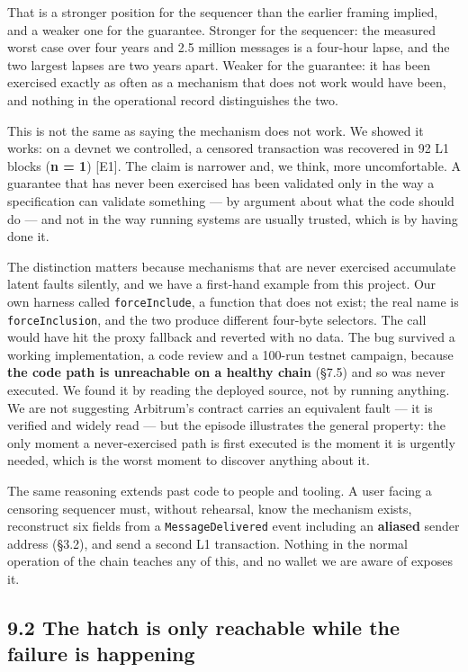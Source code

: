 \documentclass[conference]{IEEEtran}
\renewcommand{\_}{\textunderscore\allowbreak}
\begin{document}
That is a stronger position for the sequencer than the earlier framing
implied, and a weaker one for the guarantee. Stronger for the sequencer:
the measured worst case over four years and 2.5 million messages is a
four-hour lapse, and the two largest lapses are two years apart. Weaker
for the guarantee: it has been exercised exactly as often as a mechanism
that does not work would have been, and nothing in the operational
record distinguishes the two.

This is not the same as saying the mechanism does not work. We showed it
works: on a devnet we controlled, a censored transaction was recovered
in 92 L1 blocks (\textbf{n = 1}) {[}E1{]}. The claim is narrower and, we
think, more uncomfortable. A guarantee that has never been exercised has
been validated only in the way a specification can validate something
--- by argument about what the code should do --- and not in the way
running systems are usually trusted, which is by having done it.

The distinction matters because mechanisms that are never exercised
accumulate latent faults silently, and we have a first-hand example from
this project. Our own harness called \texttt{forceInclude}, a function
that does not exist; the real name is \texttt{forceInclusion}, and the
two produce different four-byte selectors. The call would have hit the
proxy fallback and reverted with no data. The bug survived a working
implementation, a code review and a 100-run testnet campaign, because
\textbf{the code path is unreachable on a healthy chain} (§7.5) and so
was never executed. We found it by reading the deployed source, not by
running anything. We are not suggesting Arbitrum's contract carries an
equivalent fault --- it is verified and widely read --- but the episode
illustrates the general property: the only moment a never-exercised path
is first executed is the moment it is urgently needed, which is the
worst moment to discover anything about it.

The same reasoning extends past code to people and tooling. A user
facing a censoring sequencer must, without rehearsal, know the mechanism
exists, reconstruct six fields from a \texttt{MessageDelivered} event
including an \textbf{aliased} sender address (§3.2), and send a second
L1 transaction. Nothing in the normal operation of the chain teaches any
of this, and no wallet we are aware of exposes it.

\subsection{9.2 The hatch is only reachable while the failure is
happening}\label{the-hatch-is-only-reachable-while-the-failure-is-happening}
\end{document}
